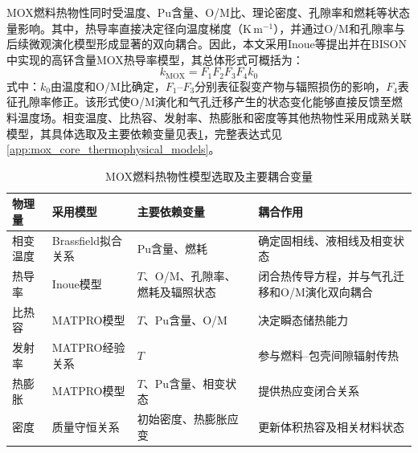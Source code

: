 MOX燃料热物性同时受温度、Pu含量、O/M比、理论密度、孔隙率和燃耗等状态量影响。其中，热导率直接决定径向温度梯度（$\mathrm{K\,m^{-1}}$），并通过O/M和孔隙率与后续微观演化模型形成显著的双向耦合。因此，本文采用Inoue等提出并在BISON中实现的高钚含量MOX热导率模型\cite{inoueThermalConductivityUranium2000,halesBISONTheoryManual2016}，其总体形式可概括为：
\begin{equation}
	k_{\mathrm{MOX}}
	=F_1F_2F_3F_4k_0
	\label{eq:ch3_mox_thermal_conductivity_coupling}
\end{equation}
\noindent 式中：$k_0$由温度和O/M比确定，$F_1$--$F_3$分别表征裂变产物与辐照损伤的影响，$F_4$表征孔隙率修正。该形式使O/M演化和气孔迁移产生的状态变化能够直接反馈至燃料温度场。相变温度、比热容、发射率、热膨胀和密度等其他热物性采用成熟关联模型，其具体选取及主要依赖变量见表\ref{tab:ch3_mox_thermophysical_selection}，完整表达式见\ref{app:mox_core_thermophysical_models}。

\begin{table}[htbp]
	\centering
	\caption{MOX燃料热物性模型选取及主要耦合变量}
	\label{tab:ch3_mox_thermophysical_selection}
	\begin{tabularx}{\textwidth}{@{}
			>{\centering\arraybackslash}m{2.4cm}
			>{\centering\arraybackslash}m{3.2cm}
			>{\centering\arraybackslash}X
			>{\centering\arraybackslash}X
			@{}}
		\toprule
		物理量 & 采用模型 & 主要依赖变量 & 耦合作用 \\
		\midrule
		相变温度 & Brassfield拟合关系 & Pu含量、燃耗 & 确定固相线、液相线及相变状态 \\
		热导率 & Inoue模型\cite{inoueThermalConductivityUranium2000,halesBISONTheoryManual2016} & $T$、O/M、孔隙率、燃耗及辐照状态 & 闭合热传导方程，并与气孔迁移和O/M演化双向耦合 \\
		比热容 & MATPRO模型\cite{hagrmanSCDAPRELAP5MOD1995} & $T$、Pu含量、O/M & 决定瞬态储热能力 \\
		发射率 & MATPRO经验关系 & $T$ & 参与燃料--包壳间隙辐射传热 \\
		热膨胀 & MATPRO模型 & $T$、Pu含量、相变状态 & 提供热应变闭合关系 \\
		密度 & 质量守恒关系 & 初始密度、热膨胀应变 & 更新体积热容及相关材料状态 \\
		\bottomrule
	\end{tabularx}
\end{table}

\label{sec:mox_mechanical_properties}

